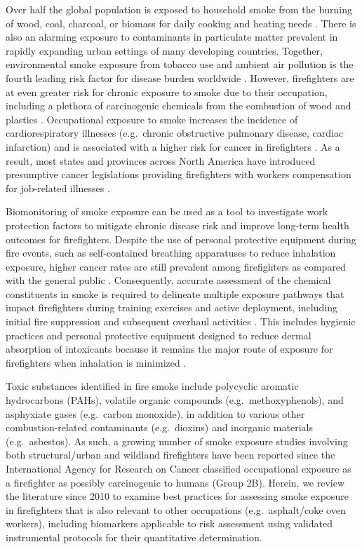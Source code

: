 \documentclass[preprint, 3p,
authoryear]{elsarticle} %
\begin{document}
Over half the global population is exposed to household smoke from the
burning of wood, coal, charcoal, or biomass for daily cooking and
heating needs \citep{1}. There is also an alarming exposure to
contaminants in particulate matter prevalent in rapidly expanding urban
settings of many developing countries. Together, environmental smoke
exposure from tobacco use and ambient air pollution is the fourth
leading risk factor for disease burden worldwide \citep{2}. However,
firefighters are at even greater risk for chronic exposure to smoke due
to their occupation, including a plethora of carcinogenic chemicals from
the combustion of wood and plastics \citep[\citet{4}, \citet{5}]{3}.
Occupational exposure to smoke increases the incidence of
cardiorespiratory illnesses (e.g.~chronic obstructive pulmonary disease,
cardiac infarction) and is associated with a higher risk for cancer in
firefighters \citep[\citet{7}]{6}. As a result, most states and
provinces across North America have introduced presumptive cancer
legislations providing firefighters with workers compensation for
job-related illnesses \citep{8}.

Biomonitoring of smoke exposure can be used as a tool to investigate
work protection factors to mitigate chronic disease risk and improve
long-term health outcomes for firefighters. Despite the use of personal
protective equipment during fire events, such as self-contained
breathing apparatuses to reduce inhalation exposure, higher cancer rates
are still prevalent among firefighters as compared with the general
public \citep{8}. Consequently, accurate assessment of the chemical
constituents in smoke is required to delineate multiple exposure
pathways that impact firefighters during training exercises and active
deployment, including initial fire suppression and subsequent overhaul
activities \citep[\citet{10}, \citet{11}]{9}. This includes hygienic
practices and personal protective equipment designed to reduce dermal
absorption of intoxicants because it remains the major route of exposure
for firefighters when inhalation is minimized \citep{12}.

Toxic substances identified in fire smoke include polycyclic aromatic
hydrocarbons (PAHs), volatile organic compounds (e.g.~methoxyphenols),
and asphyxiate gases (e.g.~carbon monoxide), in addition to various
other combustion-related contaminants (e.g.~dioxins) and inorganic
materials (e.g.~asbestos). As such, a growing number of smoke exposure
studies involving both structural/urban and wildland firefighters have
been reported \citep[\citet{13}, \citet{14}, \citet{15}, \citet{16},
\citet{17}]{6} since the International Agency for Research on Cancer
classified occupational exposure as a firefighter as possibly
carcinogenic to humans (Group 2B). Herein, we review the literature
since 2010 to examine best practices for assessing smoke exposure in
firefighters that is also relevant to other occupations
(e.g.~asphalt/coke oven workers), including biomarkers applicable to
risk assessment using validated instrumental protocols for their
quantitative determination.
\end{document}
